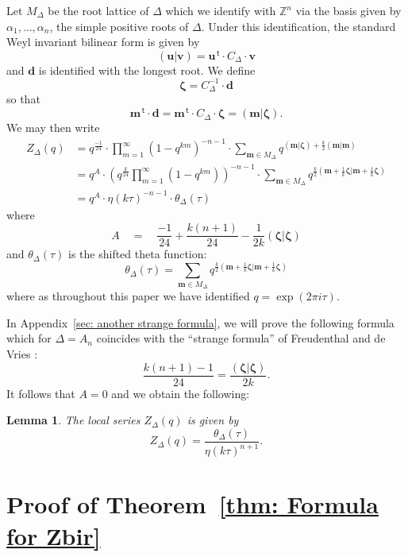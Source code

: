 \documentclass{amsart}
\newtheorem{lemma}[theorem]{Lemma}
\theoremstyle{definition}
\newcommand{\ZZ} {{\mathbb Z}}		%
\renewcommand{\top}{\,\mathsf{t}}
\newcommand{\mvec}{\bm{m}}
\newcommand{\zetavec}{\bm{\zeta }}
\newcommand{\dvec}{\bm{d }}
\newcommand{\uvec}{\bm{u }}
\newcommand{\vvec}{\bm{v }}
\begin{document}
Let $M_{\Delta}$ be the root lattice of $\Delta$ which we identify
with $\ZZ^{n}$ via the basis given by $\alpha_{1},\dotsc ,\alpha_{n}$,
the simple positive roots of $\Delta$. Under this identification, the
standard Weyl invariant bilinear form is given by
\[
(\uvec |\vvec ) = \uvec^{\top}\cdot C_{\Delta}\cdot \vvec 
\]
and $\dvec$ is identified with the longest root. 
We define
\[
\zetavec = C_{\Delta}^{-1} \cdot \dvec 
\]
so that 
\[
\mvec^{\top}\cdot \dvec = \mvec^{\top}\cdot C_{\Delta} \cdot \zetavec
= (\mvec |\zetavec ).
\]
We may then write
\begin{align*}
Z_{\Delta}(q)& = q^{\frac{-1}{24}}\cdot
\prod_{m=1}^{\infty}(1-q^{km})^{-n-1}\cdot \sum _{\mvec \in M_{\Delta}} q^{(\mvec |\zetavec )+\frac{k}{2}(\mvec |\mvec)}\\
&= q^{A} \cdot \left(q^{\frac{k}{24}}\prod_{m=1}^{\infty}(1-q^{km})
\right)^{-n-1} \cdot \sum_{\mvec \in M_{\Delta}} q^{\frac{k}{2}\left(\mvec +\frac{1}{k}\zetavec |\mvec +\frac{1}{k}\zetavec  \right)}\\
& = q^{A}\cdot  \eta (k\tau )^{-n-1}\cdot  \theta_{\Delta} (\tau )
\end{align*}
where 
\[
A \quad = \quad \frac{-1}{24} + \frac{k(n+1)}{24} - \frac{1}{2k}(\zetavec
|\zetavec )
\]
and $\theta_{\Delta}(\tau )$ is the shifted theta function:
\begin{equation}\label{eqn: defn of shifted theta function}
\theta_{\Delta}(\tau ) = \sum_{\mvec \in M_{\Delta}} q^{\frac{k}{2}\left(\mvec +\frac{1}{k}\zetavec |\mvec +\frac{1}{k}\zetavec  \right)}
\end{equation}
where as throughout this paper we have identified $q=\exp\left(2\pi i\tau  \right)$.

In Appendix~\ref{sec: another strange formula}, we will prove the
following formula which for $\Delta =A_{n}$ coincides with the
``strange formula'' of Freudenthal and de Vries
\cite{freudenthal1969linear}:
\[
 \frac{k(n+1)-1}{24}  = \frac{(\zetavec |\zetavec )}{2k}.
\]
It follows that $A=0$ and we obtain the following:
\begin{lemma}\label{lem: local series as theta/eta} The local series
$Z_{\Delta}(q)$ is given by
\[
Z_{\Delta}(q) = \frac{\theta_{\Delta}(\tau )}{\eta (k\tau )^{n+1}}. 
\]
\end{lemma}


\section{Proof of Theorem~\ref{thm: Formula for Zbir}}
\label{sec: proof of thm about Zbir}
\end{document}
